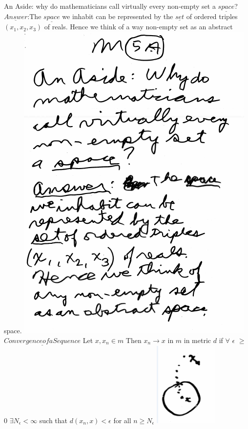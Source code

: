\documentclass[10pt,a4paper]{article}
\begin{document}
{{\newpage
An Aside: why do mathematicians call virtually every non-empty set a $\underline{space}$?
\newline
$\underline{Answer}$:The $\underline{space}$ we inhabit can be represented by the $\underline{set}$ of ordered triples $(x_1,x_2,x_3)$ of reals. Hence we think of a way non-empty set as an abstract space.
\newline
\includegraphics[scale=.5]{Pages/MS_2_im6}
\newpage
$\underline{Convergence of a Sequence}$
\newline
Let $x, x_n \in m$ Then $x_n \rightarrow x$ in $m$ in metric $d$ 
\newline
if
\newline
$\forall$ $\epsilon$ $\geq$ 0 $\exists N_\epsilon < \infty$
\newline
such that
\newline
$d(x_n,x)< \epsilon$
\newline
for all $n \geq N_\epsilon$ 
\newline
\includegraphics[scale=1]{Pages/MS_2_pic1}
}}
\end{document}
